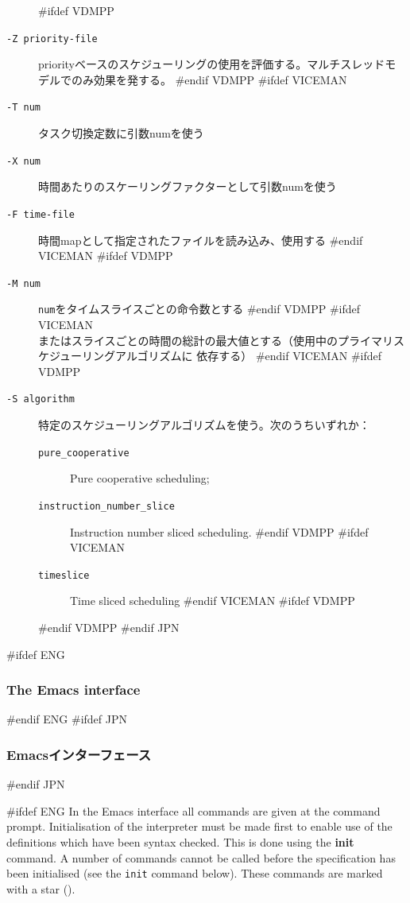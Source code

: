 \documentclass[\pformat,12pt]{article}
\newcommand{\cmd}{\tt }
\begin{document}
\begin{description}
#ifdef VDMPP
\item[{\tt -Z priority-file}]
  priorityベースのスケジューリングの使用を評価する。マルチスレッドモデルでのみ効果を発する。
#endif VDMPP
#ifdef VICEMAN
\item[{\tt -T num}] タスク切換定数に引数numを使う
\item[{\tt -X num}] 時間あたりのスケーリングファクターとして引数numを使う
\item[{\tt -F time-file}] 時間mapとして指定されたファイルを読み込み、使用する
#endif VICEMAN
#ifdef VDMPP
\item[{\tt -M num}] {\tt num}をタイムスライスごとの命令数とする
#endif VDMPP
#ifdef VICEMAN
\\ またはスライスごとの時間の総計の最大値とする（使用中のプライマリスケジューリングアルゴリズムに
依存する）
#endif VICEMAN
#ifdef VDMPP

\item[{\tt -S algorithm}]
  特定のスケジューリングアルゴリズムを使う。次のうちいずれか：
  \begin{description}
  \item[{\tt pure\_cooperative}] Pure cooperative scheduling;
  \item[{\tt instruction\_number\_slice}] Instruction number sliced
    scheduling.
#endif VDMPP
#ifdef VICEMAN
  \item[{\tt timeslice}] Time sliced scheduling
#endif VICEMAN
#ifdef VDMPP
  \end{description}
#endif VDMPP
#endif JPN

\end{description}

#ifdef ENG
\subsubsection{The Emacs interface}
#endif ENG
#ifdef JPN
\subsubsection{Emacsインターフェース}
#endif JPN

#ifdef ENG
In the Emacs interface all commands are given at the command
prompt. Initialisation of the interpreter must be made first to enable
use of the definitions which have been syntax checked. This is done
using the \textbf{init} command. A number of commands cannot be
called before the specification has 
been initialised (see the {\cmd init} command below).  These commands
are marked with a star ({\tt *}).
\end{document}
